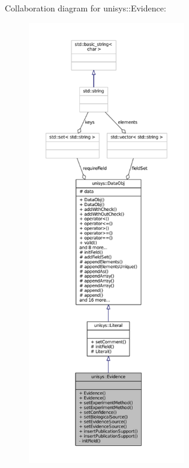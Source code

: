 Collaboration diagram for unisys\-:\-:Evidence\-:
\nopagebreak
\begin{figure}[H]
\begin{center}
\leavevmode
\includegraphics[height=550pt]{classunisys_1_1Evidence__coll__graph}
\end{center}
\end{figure}
